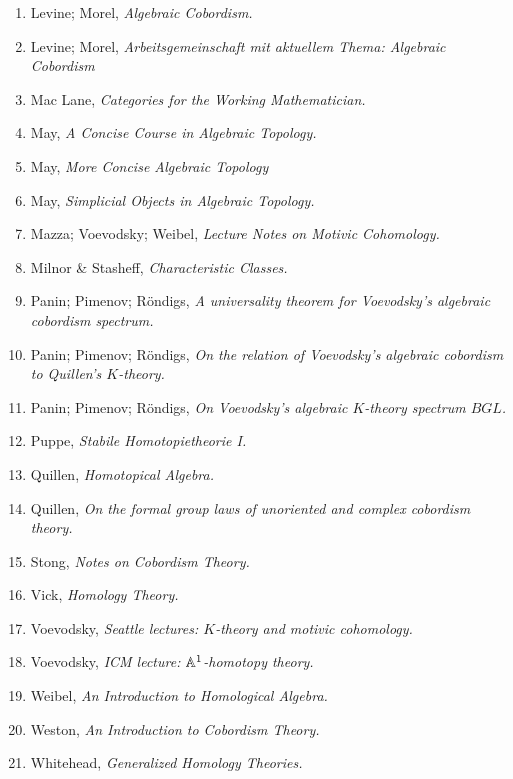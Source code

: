 \documentclass{article}%
\newcounter{Objects}
\begin{document}
\begin{enumerate}
\item Levine; Morel, {\it Algebraic Cobordism.}
\item Levine; Morel, {\it Arbeitsgemeinschaft mit aktuellem Thema:
  Algebraic Cobordism}
\item Mac Lane, {\it Categories for the Working Mathematician.}
\item May, {\it A Concise Course in Algebraic Topology.}
\item May, {\it More Concise Algebraic Topology}
\item May, {\it Simplicial Objects in Algebraic Topology.}
\item Mazza; Voevodsky; Weibel, {\it Lecture Notes on Motivic Cohomology.}
\item Milnor \& Stasheff, {\it Characteristic Classes.}
\item Panin; Pimenov; R\"ondigs, {\it A universality theorem for Voevodsky's algebraic cobordism spectrum.}
\item Panin; Pimenov; R\"ondigs, {\it On the relation of Voevodsky's algebraic cobordism to Quillen's $K$-theory.}
\item Panin; Pimenov; R\"ondigs, {\it On Voevodsky's algebraic $K$-theory spectrum $BGL$.}
\item Puppe, {\it Stabile Homotopietheorie I.}
\item Quillen, {\it Homotopical Algebra.}
\item Quillen, {\it On the formal group laws of unoriented and complex cobordism theory.}
\item Stong, {\it Notes on Cobordism Theory.}
\item Vick, {\it Homology Theory.}
\item Voevodsky, {\it Seattle lectures: $K$-theory and motivic cohomology.}
\item Voevodsky, {\it ICM lecture: $\mathbb{A}^1$-homotopy theory.}
\item Weibel, {\it An Introduction to Homological Algebra.}
\item Weston, {\it An Introduction to Cobordism Theory.}
\item Whitehead, {\it Generalized Homology Theories.} 
\end{enumerate}
\end{document}
